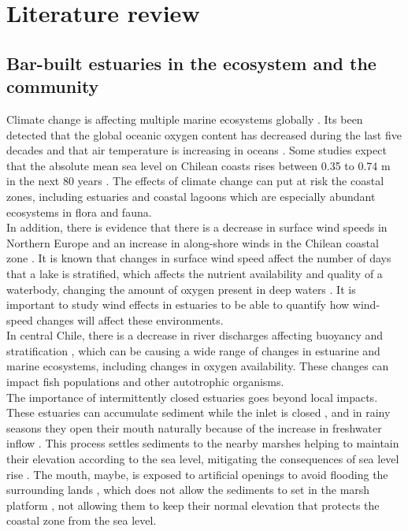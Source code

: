 \documentclass[tesis.tex]{subfiles}
\begin{document}
    
\section{Literature review}

\subsection{Bar-built estuaries in the ecosystem and the community}

Climate change is affecting multiple marine ecosystems globally \citep{hewitt2016multiple}. Its been detected that the global oceanic oxygen content has decreased during the last five decades \citep{schmidtko2017decline} and that air temperature is increasing in oceans \citep{omstedt2004baltic, jones1999surface}. Some studies expect that the absolute mean sea level on Chilean coasts rises between 0.35 to 0.74 m in the next 80 years \citep{winckler2020evidence}. The effects of climate change can put at risk the coastal zones, including estuaries and coastal lagoons which are especially abundant ecosystems in flora and fauna.\\

In addition, there is evidence that there is a decrease in surface wind speeds in Northern Europe \citep{woolway2017atmospheric} and an increase in along-shore winds in the Chilean coastal zone \citep{winckler2020evidence}. It is known that changes in surface wind speed affect the number of days that a lake is stratified, which affects the nutrient availability and quality of a waterbody, changing the amount of oxygen present in deep waters \citep{woolway2017atmospheric}. It is important to study wind effects in estuaries to be able to quantify how wind-speed changes will affect these environments.\\

In central Chile, there is a decrease in river discharges affecting buoyancy and stratification \citep{winckler2020evidence}, which can be causing a wide range of changes in estuarine and marine ecosystems, including changes in oxygen availability. These changes can impact fish populations and other autotrophic organisms.\\

The importance of intermittently closed estuaries goes beyond local impacts. These estuaries can accumulate sediment while the inlet is closed \citep{thorne2021wetlands}, and in rainy seasons they open their mouth naturally because of the increase in freshwater inflow \citep{hoeksema2018factors}. This process settles sediments to the nearby marshes helping to maintain their elevation according to the sea level, mitigating the consequences of sea level rise \citep{thorne2021wetlands}. The mouth, maybe, is exposed to artificial openings to avoid flooding the surrounding lands \citep{Behrens2013}, which does not allow the sediments to set in the marsh platform \citep{thorne2021wetlands}, not allowing them to keep their normal elevation that protects the coastal zone from the sea level.\\
\end{document}
